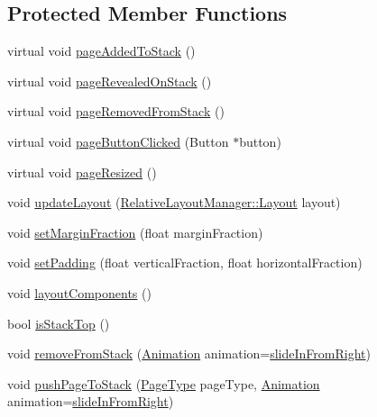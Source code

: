 \subsection*{Protected Member Functions}
\begin{DoxyCompactItemize}
\item 
virtual void \mbox{\hyperlink{classPageComponent_af31c1ed2264dfcbfd6ec1e32ee90fbef}{page\+Added\+To\+Stack}} ()
\item 
virtual void \mbox{\hyperlink{classPageComponent_adf0158301585f91e9bad647adc6ed86c}{page\+Revealed\+On\+Stack}} ()
\item 
virtual void \mbox{\hyperlink{classPageComponent_a50d861b6ec4c25dcaa8de2db68cc3b5e}{page\+Removed\+From\+Stack}} ()
\item 
virtual void \mbox{\hyperlink{classPageComponent_a048ad03d61031e4e89ffed12916db9ae}{page\+Button\+Clicked}} (Button $\ast$button)
\item 
virtual void \mbox{\hyperlink{classPageComponent_a9f1abe0866fdc56ed3bc69706027976a}{page\+Resized}} ()
\item 
void \mbox{\hyperlink{classPageComponent_a94072392071e79cf7d5fe655336aa277}{update\+Layout}} (\mbox{\hyperlink{classRelativeLayoutManager_a3dcd4cd0bc41754f3b4a64bc29b5eca5}{Relative\+Layout\+Manager\+::\+Layout}} layout)
\item 
void \mbox{\hyperlink{classPageComponent_a7dd0b15f5369377d281fc66509979090}{set\+Margin\+Fraction}} (float margin\+Fraction)
\item 
void \mbox{\hyperlink{classPageComponent_a0632af1c5b40e99587ce79a781eee6b6}{set\+Padding}} (float vertical\+Fraction, float horizontal\+Fraction)
\item 
void \mbox{\hyperlink{classPageComponent_a7c51a53665d56c9f2f33da194bdf99ab}{layout\+Components}} ()
\item 
bool \mbox{\hyperlink{classPageComponent_a1ffe94ede2560dac8c2b1b9acef4192c}{is\+Stack\+Top}} ()
\item 
void \mbox{\hyperlink{classPageComponent_a3816c970f27dcdcbaab09bbe77c8ea97}{remove\+From\+Stack}} (\mbox{\hyperlink{classPageComponent_a9ee0e31dfa2a628bc303d30ec5774e57}{Animation}} animation=\mbox{\hyperlink{classPageComponent_a9ee0e31dfa2a628bc303d30ec5774e57a8c9e13babb1de0b453edf68fbbb86e9e}{slide\+In\+From\+Right}})
\item 
void \mbox{\hyperlink{classPageComponent_a92c6528f2296b6ab1b2e3420aa75a198}{push\+Page\+To\+Stack}} (\mbox{\hyperlink{classPageComponent_a39cf3ea9f212fd4383133881dec6e26a}{Page\+Type}} page\+Type, \mbox{\hyperlink{classPageComponent_a9ee0e31dfa2a628bc303d30ec5774e57}{Animation}} animation=\mbox{\hyperlink{classPageComponent_a9ee0e31dfa2a628bc303d30ec5774e57a8c9e13babb1de0b453edf68fbbb86e9e}{slide\+In\+From\+Right}})
\end{DoxyCompactItemize}


